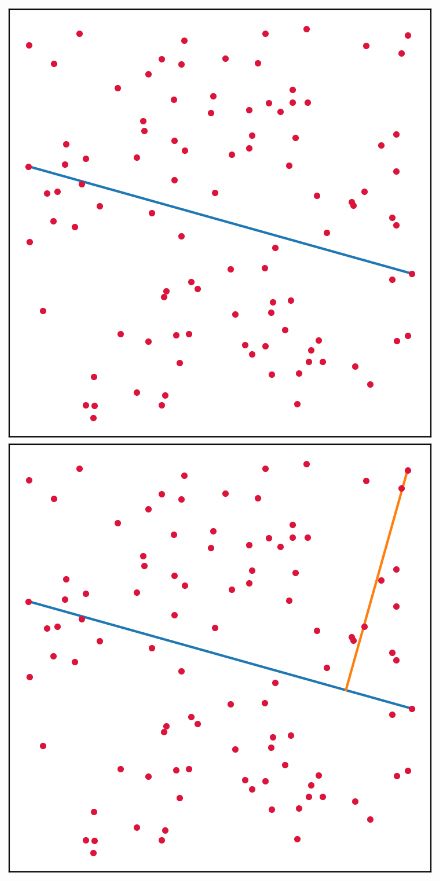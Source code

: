 \documentclass[]{finalproject}
\begin{document}
\begin{figure}[H]
    \centering
    \begin{minipage}{.245\linewidth}
		\includegraphics[width=\linewidth]{quickhull1.png}
	\end{minipage}
	\begin{minipage}{.245\linewidth}
		\includegraphics[width=\linewidth]{quickhull2.png}

\end{minipage}
\end{figure}
\end{document}
